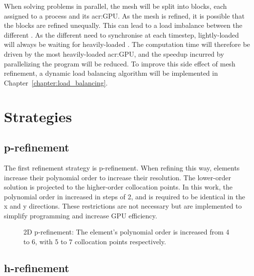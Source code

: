 When solving problems in parallel, the mesh will be split into blocks, each assigned to a process
and its \acrshort{acr:GPU}. As the mesh is refined, it is possible that the blocks are refined
unequally. This can lead to a load imbalance between the different . As the
different  need to synchronise at each timestep, lightly-loaded
 will always be waiting for heavily-loaded . The computation
time will therefore be driven by the most heavily-loaded \acrshort{acr:GPU}, and the speedup
incurred by parallelizing the program will be reduced. To improve this side effect of mesh
refinement, a dynamic load balancing algorithm will be implemented in
Chapter~\ref{chapter:load_balancing}.

\section{Strategies}\label{section:adaptive_mesh_refinement:refinement_strategies}

\subsection{p-refinement}\label{subsection:adaptive_mesh_refinement:refinement_strategies:p-refinement}

The first refinement strategy is p-refinement. When refining this way, elements increase their
polynomial order to increase their resolution. The lower-order solution is projected to the
higher-order collocation points. In this work, the polynomial order in increased in steps of 2, and
is required to be identical in the x and y directions. These restrictions are not necessary but are
implemented to simplify programming and increase GPU efficiency.

\begin{figure}[H]
	\centering
	
	\caption{2D p-refinement: The element's polynomial order is increased from 4 to 6, with 5 to 7 collocation points respectively.}\label{fig:p-refinement}
\end{figure}

\subsection{h-refinement}\label{subsection:adaptive_mesh_refinement:refinement_strategies:h-refinement}

